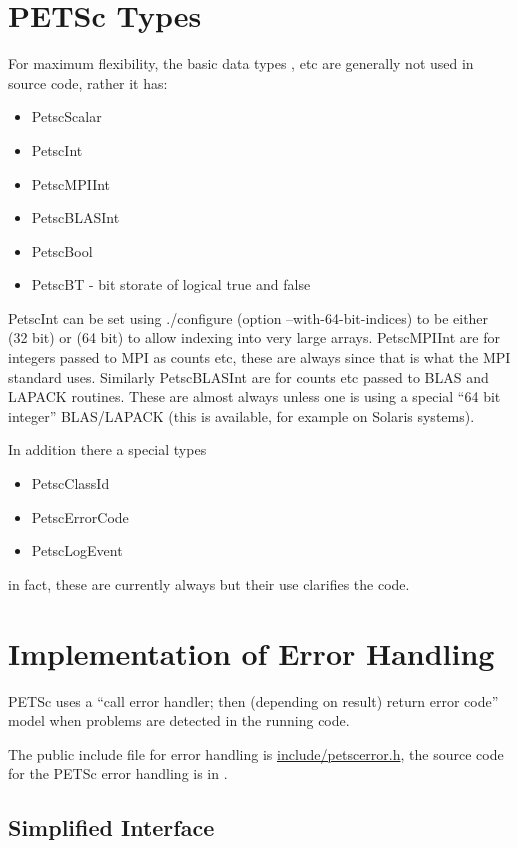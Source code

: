 \documentclass[twoside,12pt]{../sty/report_petsc}
\begin{document}
\section{PETSc Types}
For maximum flexibility, the basic data types ,  etc are
generally not used in source code, rather it has:
\begin{itemize}
  \item PetscScalar
  \item PetscInt
  \item PetscMPIInt
  \item PetscBLASInt
  \item PetscBool
  \item PetscBT  - bit storate of logical true and false
\end{itemize}
PetscInt can be set using ./configure (option --with-64-bit-indices) to be either  (32 bit) or 
(64 bit)
to allow indexing into very large arrays. PetscMPIInt are for integers passed to MPI
as counts etc, these are always  since that is what the MPI standard uses. Similarly
PetscBLASInt are for counts etc passed to BLAS and LAPACK routines. These are almost always
 unless one is using a special ``64 bit integer'' BLAS/LAPACK (this is available, for
example on Solaris systems).

In addition there a special types
\begin{itemize}
  \item PetscClassId
  \item PetscErrorCode
  \item PetscLogEvent
\end{itemize}
in fact, these are currently always  but their use clarifies the code.

\section{Implementation of Error Handling}

PETSc  uses a ``call error handler; then (depending on result) return
error code'' model when problems are detected in the running code.

The public include file for error handling is
 \href{http://www.mcs.anl.gov/petsc/petsc-dev/include/petscerror.h.html}{include/petscerror.h}, the
source code for the PETSc error handling is in
.

\subsection{Simplified Interface}
\end{document}
